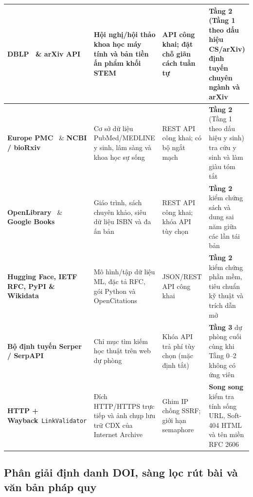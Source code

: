 {\begin{longtable}{|L{0.23}|L{0.29}|L{0.21}|L{0.27}|}
\hline
\textbf{DBLP}~\cite{dblp} \& \textbf{arXiv API}~\cite{arxiv-api} & Hội nghị/hội thảo khoa học máy tính và bản tiền ấn phẩm khối STEM & API công khai; đặt chỗ giãn cách tuần tự & \textbf{Tầng 2} (Tầng 1 theo dấu hiệu CS/arXiv) định tuyến chuyên ngành và arXiv \\
\hline
\textbf{Europe PMC}~\cite{europepmc} \& \textbf{NCBI / bioRxiv} & Cơ sở dữ liệu PubMed/\allowbreak MEDLINE y sinh, lâm sàng và khoa học sự sống & REST API công khai; có bộ ngắt mạch & \textbf{Tầng 2} (Tầng 1 theo dấu hiệu y sinh) tra cứu y sinh và làm giàu tóm tắt \\
\hline
\textbf{OpenLibrary}~\cite{openlibrary} \& \textbf{Google Books} & Giáo trình, sách chuyên khảo, siêu dữ liệu ISBN và đa ấn bản & REST API công khai; khóa API tùy chọn & \textbf{Tầng 2} kiểm chứng sách và dung sai năm giữa các lần tái bản \\
\hline
\textbf{Hugging Face, IETF RFC, PyPI \& Wikidata} & Mô hình/tập dữ liệu ML, đặc tả RFC, gói Python và OpenCitations & JSON/REST API công khai & \textbf{Tầng 2} kiểm chứng phần mềm, tiêu chuẩn kỹ thuật và trích dẫn mở \\
\hline
\textbf{Bộ định tuyến Serper / SerpAPI} & Chỉ mục tìm kiếm học thuật trên web dự phòng & Khóa API trả phí tùy chọn (mặc định tắt) & \textbf{Tầng 3} dự phòng cuối cùng khi Tầng 0--2 không có ứng viên \\
\hline
\textbf{HTTP + Wayback}~\cite{wayback-cdx}\newline\texttt{LinkValidator} & Đích HTTP/HTTPS trực tiếp và ảnh chụp lưu trữ CDX của Internet Archive & Ghim IP chống SSRF; giới hạn semaphore & \textbf{Song song} kiểm tra tính sống URL, Soft-404 HTML và tên miền RFC 2606~\cite{rfc2606} \\
\hline
\end{longtable}
}

\subsection{Phân giải định danh DOI, sàng lọc rút bài và văn bản pháp quy}


